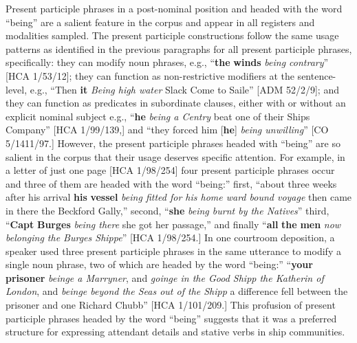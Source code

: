   Present participle phrases in a post-nominal position and headed with the word “being” are a salient feature in the corpus and appear in all registers and modalities sampled. The present participle constructions follow the same usage patterns as identified in the previous paragraphs for all present participle phrases, specifically: they can modify noun phrases, e.g., “\textbf{the} \textbf{winds} \textit{being contrary}” [HCA 1/53/12]; they can function as non-restrictive modifiers at the sentence-level, e.g., “Then \textbf{it} \textit{Being high water} Slack Come to Saile” [ADM 52/2/9]; and they can function as predicates in subordinate clauses, either with or without an explicit nominal subject e.g., “\textbf{he} \textit{being a Centry} beat one of their Ships Company” [HCA 1/99/139,] and “they forced him [\textbf{he}] \textit{being unwilling}” [CO 5/1411/97.] However, the present participle phrases headed with “being” are so salient in the corpus that their usage deserves specific attention. For example, in a letter of just one page [HCA 1/98/254] four present participle phrases occur and three of them are headed with the word “being:” first, “about three weeks after his arrival \textbf{his} \textbf{vessel} \textit{being fitted for his home ward bound voyage} then came in there the Beckford Gally,” second, “\textbf{she} \textit{being burnt by the Natives}” third, “\textbf{Capt} \textbf{Burges} \textit{being there} she got her passage,” and finally “\textbf{all} \textbf{the} \textbf{men} \textit{now belonging the Burges Shippe}” [HCA 1/98/254.] In one courtroom deposition, a speaker used three present participle phrases in the same utterance to modify a single noun phrase, two of which are headed by the word “being:” “\textbf{your} \textbf{prisoner} \textit{beinge a Marryner}, and \textit{goinge in the Good Shipp the Katherin of London}, and \textit{beinge beyond the Seas out of the Shipp} a difference fell between the prisoner and one Richard Chubb” [HCA 1/101/209.] This profusion of present participle phrases headed by the word “being” suggests that it was a preferred structure for expressing attendant details and stative verbs in ship communities. 

